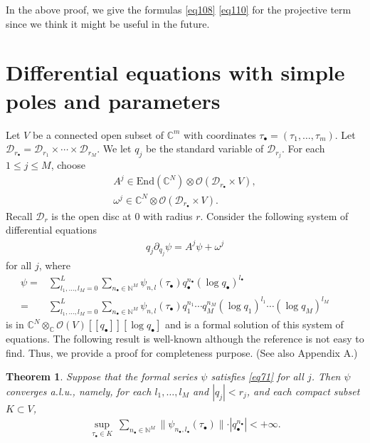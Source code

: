 \documentclass[12pt,a4paper,notitlepage]{article}
\theoremstyle{definition}
\theoremstyle{plain}
\newtheorem{thm}[df]{Theorem}
\newcommand{\mc}{\mathcal}
\newcommand{\End}{\mathrm{End}} %
\newcommand{\scr}{\mathscr}
\newcommand{\blt}{\bullet}
\newcommand{\Cbb}{\mathbb C}
\newcommand{\Nbb}{\mathbb N}
\numberwithin{equation}{section}
\begin{document}
In the above proof, we give the formulas \eqref{eq108} \eqref{eq110} for the projective term since we think it might be useful in the future.








\appendix





\section{Differential equations with simple poles and parameters}





Let $V$ be a connected  open subset of $\Cbb^m$ with coordinates $\tau_\blt=(\tau_1,\dots,\tau_m)$. Let $\mc D_{r_\blt}=\mc D_{r_1}\times\cdots\times\mc D_{r_M}$.  We let $q_j$ be the standard variable of $\mc D_{r_j}$.  For each $1\leq j\leq M$, choose
\begin{gather*}
A^j\in\End(\Cbb^N)\otimes\scr O(\mc D_{r_\blt}\times V),\\
\omega^j\in\Cbb^N\otimes\scr O(\mc D_{r_\blt}\times V).
\end{gather*}
Recall $\mc D_r$ is the open disc at $0$ with radius $r$. Consider the following  system of differential equations
\begin{align}
q_j\partial_{q_j}\psi=A^j\psi+\omega^j\label{eq71}
\end{align}
for all $j$, where
\begin{align}
\psi=&\sum_{l_1,\dots,l_M=0}^L\sum_{n_\blt\in \Nbb^M}\psi_{n,l}(\tau_\blt)q_\blt^{n_\blt}(\log q_\blt)^{l_\blt}\nonumber\\
=&\sum_{l_1,\dots,l_M=0}^L\sum_{n_\blt\in \Nbb^M}\psi_{n,l}(\tau_\blt)q_1^{n_1}\cdots q_M^{n_M}(\log q_1)^{l_1}\cdots (\log q_M)^{l_M}\qquad\label{eq77}
\end{align}
is in $\Cbb^N\otimes_\Cbb\scr O(V)[[q_\blt]][\log q_\blt]$ and is a formal solution of this system of equations. The following result is well-known although the reference is not easy to find. Thus, we provide a proof for completeness purpose. (See also \cite{McR21} Appendix A.)

\begin{thm}\label{lb39}
Suppose that the formal series $\psi$ satisfies \eqref{eq71} for all $j$. Then $\psi$ converges a.l.u., namely, for each $l_1,\dots,l_M$ and $|q_j|<r_j$, and each compact subset $K\subset V$,
\begin{align}
\sup_{\tau_\blt\in K}~\sum_{n_\blt\in\Nbb^M}\lVert \psi_{n_\blt,l_\blt}(\tau_\blt) \lVert \cdot |q_\blt^{n_\blt}|<+\infty	\label{eq103}.
\end{align}
\end{thm}
\end{document}
